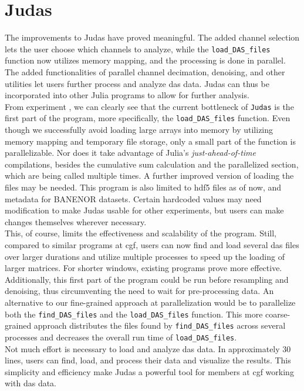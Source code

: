 \section{Judas}
\label{disc:judas}

The improvements to Judas have proved meaningful. The added channel selection lets the user choose which channels to analyze, while the \texttt{load\_DAS\_files} function now utilizes memory mapping, and the processing is done in parallel. The added functionalities of parallel channel decimation, denoising, and other utilities let users further process and analyze \acrshort{das} data. Judas can thus be incorporated into other Julia programs to allow for further analysis. \\

From experiment , we can clearly see that the current bottleneck of \texttt{Judas} is the first part of the program, more specifically, the \texttt{load\_DAS\_files} function. Even though we successfully avoid loading large arrays into memory by utilizing memory mapping and temporary file storage, only a small part of the function is parallelizable. Nor does it take advantage of Julia's \textit{just-ahead-of-time} compilations, besides the cumulative sum calculation and the parallelized section, which are being called multiple times. A further improved version of loading the files may be needed. This program is also limited to \acrshort{hdf5} files as of now, and metadata for BANENOR datasets. Certain hardcoded values may need modification to make Judas usable for other experiments, but users can make changes themselves wherever necessary. \\

This, of course, limits the effectiveness and scalability of the program. Still, compared to similar programs at \acrshort{cgf}, users can now find and load several \acrshort{das} files over larger durations and utilize multiple processes to speed up the loading of larger matrices. For shorter windows, existing programs prove more effective. \\

Additionally, this first part of the program could be run before resampling and denoising, thus circumventing the need to wait for pre-processing data. An alternative to our fine-grained approach at parallelization would be to parallelize both the \texttt{find\_DAS\_files} and the \texttt{load\_DAS\_files} function. This more coarse-grained approach distributes the files found by \texttt{find\_DAS\_files} across several processes and decreases the overall run time of \texttt{load\_DAS\_files}.\\

Not much effort is necessary to load and analyze \acrshort{das} data. In approximately 30 lines, users can find, load, and process their data and visualize the results. This simplicity and efficiency make Judas a powerful tool for members at \acrshort{cgf} working with \acrshort{das} data.


